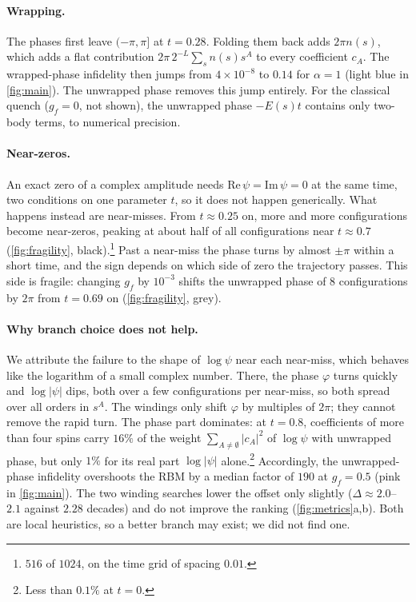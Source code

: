 \documentclass[11pt,a4paper]{article}
\begin{document}
\paragraph{Wrapping.} The phases first leave $(-\pi,\pi]$ at $t=0.28$. Folding them back adds $2\pi n(s)$, which adds a flat contribution $2\pi\,2^{-L}\sum_s n(s)s^A$ to every coefficient $c_A$. The wrapped-phase infidelity then jumps from $4\times10^{-8}$ to $0.14$ for $\alpha=1$ (light blue in \cref{fig:main}). The unwrapped phase removes this jump entirely. For the classical quench ($g_f=0$, not shown), the unwrapped phase $-E(s)t$ contains only two-body terms, to numerical precision.

\paragraph{Near-zeros.} An exact zero of a complex amplitude needs $\mathrm{Re}\,\psi=\mathrm{Im}\,\psi=0$ at the same time, two conditions on one parameter $t$, so it does not happen generically. What happens instead are near-misses. From $t\approx0.25$ on, more and more configurations become near-zeros, peaking at about half of all configurations near $t\approx0.7$ (\cref{fig:fragility}, black).\footnote{$516$ of $1024$, on the time grid of spacing $0.01$.} Past a near-miss the phase turns by almost $\pm\pi$ within a short time, and the sign depends on which side of zero the trajectory passes. This side is fragile: changing $g_f$ by $10^{-3}$ shifts the unwrapped phase of $8$ configurations by $2\pi$ from $t=0.69$ on (\cref{fig:fragility}, grey).

\paragraph{Why branch choice does not help.} We attribute the failure to the shape of $\log\psi$ near each near-miss, which behaves like the logarithm of a small complex number. There, the phase $\varphi$ turns quickly and $\log|\psi|$ dips, both over a few configurations per near-miss, so both spread over all orders in $s^A$. The windings only shift $\varphi$ by multiples of $2\pi$; they cannot remove the rapid turn. The phase part dominates: at $t=0.8$, coefficients of more than four spins carry $16\%$ of the weight $\sum_{A\neq\emptyset}|c_A|^2$ of $\log\psi$ with unwrapped phase, but only $1\%$ for its real part $\log|\psi|$ alone.\footnote{Less than $0.1\%$ at $t=0$.} Accordingly, the unwrapped-phase infidelity overshoots the RBM by a median factor of $190$ at $g_f=0.5$ (pink in \cref{fig:main}). The two winding searches lower the offset only slightly ($\Delta\approx2.0$--$2.1$ against $2.28$ decades) and do not improve the ranking (\cref{fig:metrics}a,b). Both are local heuristics, so a better branch may exist; we did not find one.
\end{document}
